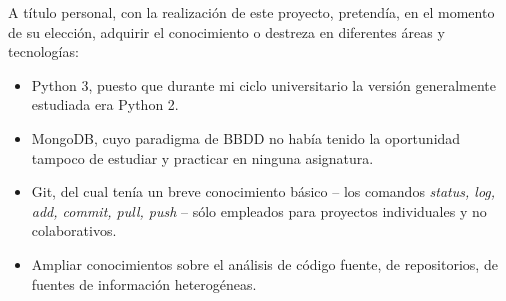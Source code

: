 A título personal, con la realización de este proyecto, pretendía, en el momento de su elección, adquirir el conocimiento o destreza en diferentes áreas y tecnologías:

\begin{itemize}
\item Python 3, puesto que durante mi ciclo universitario la versión generalmente estudiada era Python 2.

\item MongoDB, cuyo paradigma de BBDD no había tenido la oportunidad tampoco de estudiar y practicar en ninguna asignatura.

\item Git, del cual tenía un breve conocimiento básico – los comandos \textit{status, log, add, commit, pull, push} – sólo empleados para proyectos individuales y no colaborativos.

\item Ampliar conocimientos sobre el análisis de código fuente, de repositorios, de fuentes de información heterogéneas.
\end{itemize}





